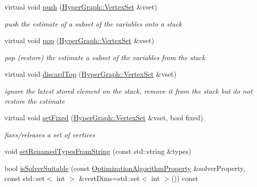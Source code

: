 \begin{DoxyCompactItemize}
virtual void \mbox{\hyperlink{structg2o_1_1_optimizable_graph_a1d65a6854936147a92f7ba664302993e}{push}} (\mbox{\hyperlink{classg2o_1_1_hyper_graph_a703938cdb4bb636860eed55a2489d70c}{Hyper\+Graph\+::\+Vertex\+Set}} \&vset)
\begin{DoxyCompactList}\small\item\em push the estimate of a subset of the variables onto a stack \end{DoxyCompactList}\item 
virtual void \mbox{\hyperlink{structg2o_1_1_optimizable_graph_a83425dbe755d22877ba692e93e04a6af}{pop}} (\mbox{\hyperlink{classg2o_1_1_hyper_graph_a703938cdb4bb636860eed55a2489d70c}{Hyper\+Graph\+::\+Vertex\+Set}} \&vset)
\begin{DoxyCompactList}\small\item\em pop (restore) the estimate a subset of the variables from the stack \end{DoxyCompactList}\item 
virtual void \mbox{\hyperlink{structg2o_1_1_optimizable_graph_a74cbd91a3e05c1f497b4675b0e70113a}{discard\+Top}} (\mbox{\hyperlink{classg2o_1_1_hyper_graph_a703938cdb4bb636860eed55a2489d70c}{Hyper\+Graph\+::\+Vertex\+Set}} \&vset)
\begin{DoxyCompactList}\small\item\em ignore the latest stored element on the stack, remove it from the stack but do not restore the estimate \end{DoxyCompactList}\item 
virtual void \mbox{\hyperlink{structg2o_1_1_optimizable_graph_a07514f6186d19b6d893a771c0bb6abf9}{set\+Fixed}} (\mbox{\hyperlink{classg2o_1_1_hyper_graph_a703938cdb4bb636860eed55a2489d70c}{Hyper\+Graph\+::\+Vertex\+Set}} \&vset, bool fixed)
\begin{DoxyCompactList}\small\item\em fixes/releases a set of vertices \end{DoxyCompactList}\item 
void \mbox{\hyperlink{structg2o_1_1_optimizable_graph_afaa77a4624619237563fe94cfd7b76fd}{set\+Renamed\+Types\+From\+String}} (const std\+::string \&types)
\item 
bool \mbox{\hyperlink{structg2o_1_1_optimizable_graph_a5b957f752c6afe7bc76baf00129f854e}{is\+Solver\+Suitable}} (const \mbox{\hyperlink{structg2o_1_1_optimization_algorithm_property}{Optimization\+Algorithm\+Property}} \&solver\+Property, const std\+::set$<$ int $>$ \&vert\+Dims=std\+::set$<$ int $>$()) const
\item 

\end{DoxyCompactItemize}
